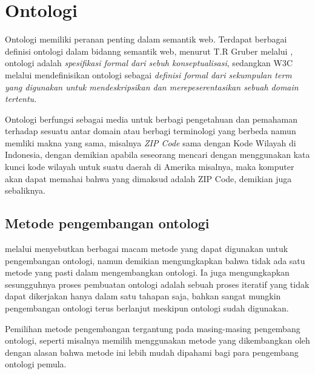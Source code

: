 \section{Ontologi}
Ontologi memiliki peranan penting dalam semantik web. Terdapat berbagai definisi ontologi dalam bidanng semantik web, menurut T.R Gruber melalui \citet*{antoniou}, ontologi adalah \emph{spesifikasi formal dari sebuh konseptualisasi}, sedangkan W3C melalui \citet{liyang_yu} mendefinisikan ontologi sebagai \emph{definisi formal dari sekumpulan term yang digunakan untuk mendeskripsikan dan merepeserentasikan sebuah domain tertentu.}

Ontologi berfungsi sebagai media untuk berbagi pengetahuan dan pemahaman terhadap sesuatu antar domain atau berbagi terminologi yang berbeda namun memliki makna yang sama, misalnya \emph{ZIP Code} sama dengan Kode Wilayah di Indonesia, dengan demikian apabila seseorang mencari dengan menggunakan kata kunci kode wilayah untuk suatu daerah di Amerika misalnya, maka komputer akan dapat memahai bahwa yang dimaksud adalah ZIP Code, demikian juga sebaliknya.

\subsection{Metode pengembangan ontologi}
\citet{fernandez_lopez} melalui \citet*{fonou_huisman} menyebutkan berbagai macam metode yang dapat digunakan untuk pengembangan ontologi, namun demikian \citet{noy_mcguinness} mengungkapkan bahwa tidak ada satu metode yang pasti dalam mengembangkan ontologi. Ia juga mengungkapkan sesungguhnya proses pembuatan ontologi adalah sebuah proses iteratif yang tidak dapat dikerjakan hanya dalam satu tahapan saja, bahkan sangat mungkin pengembangan ontologi terus berlanjut meskipun ontologi sudah digunakan. 

Pemilihan metode pengembangan tergantung pada masing-masing pengembang ontologi, seperti misalnya \citet*{fonou_huisman} memilih menggunakan metode yang dikembangkan oleh \citet*{uschold_king} dengan alasan bahwa metode ini lebih mudah dipahami bagi para pengembang ontologi pemula.


